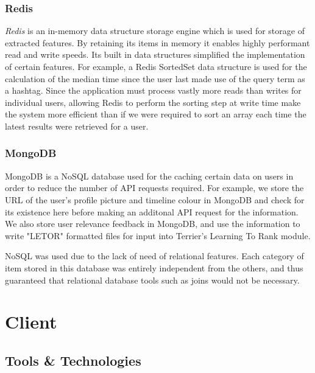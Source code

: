 \documentclass{l4proj}
\begin{document}

        \subsubsection{Redis}
        \textit{Redis} is an in-memory data structure storage engine which is used for storage of extracted features. By retaining its items in memory it enables highly performant read and write speeds. Its built in data structures simplified the implementation of certain features. For example, a Redis SortedSet data structure is used for the calculation of the median time since the user last made use of the query term as a hashtag. Since the application must process vastly more reads than writes for individual users, allowing Redis to perform the sorting step at write time make the system more efficient than if we were required to sort an array each time the latest results were retrieved for a user.
        
         \subsubsection{MongoDB}
         MongoDB is a NoSQL database used for the caching certain data on users in order to reduce the number of API requests required. For example, we store the URL of the user's profile picture and timeline colour in MongoDB and check for its existence here before making an additonal API request for the information. We also store user relevance feedback in MongoDB, and use the information to write "LETOR" formatted files for input into Terrier's Learning To Rank module.
         
         NoSQL was used due to the lack of need of relational features. Each category of item stored in this database was entirely independent from the others, and thus guaranteed that relational database tools such as joins would not be necessary.

\section{Client}

    \subsection{Tools \& Technologies}
    
\end{document}
